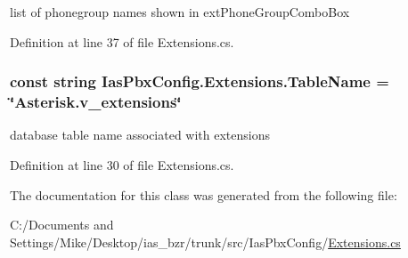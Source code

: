 list of phonegroup names shown in extPhoneGroupComboBox 

Definition at line 37 of file Extensions.cs.\hypertarget{class_ias_pbx_config_1_1_extensions_a259337feb936fbf177fcc0c03863b710}{
\subsubsection[{TableName}]{\setlength{\rightskip}{0pt plus 5cm}const string {\bf IasPbxConfig.Extensions.TableName} = \char`\"{}Asterisk.v\_\-extensions\char`\"{}}}
\label{class_ias_pbx_config_1_1_extensions_a259337feb936fbf177fcc0c03863b710}


database table name associated with extensions 

Definition at line 30 of file Extensions.cs.

The documentation for this class was generated from the following file:\begin{DoxyCompactItemize}
\item 
C:/Documents and Settings/Mike/Desktop/ias\_\-bzr/trunk/src/IasPbxConfig/\hyperlink{_extensions_8cs}{Extensions.cs}\end{DoxyCompactItemize}
